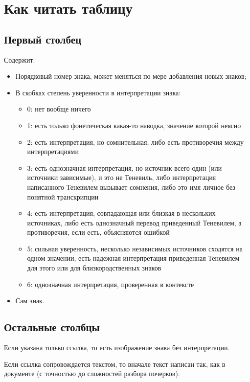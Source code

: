 \documentclass{article}
\begin{document}
\section{Как читать таблицу} 

\subsection{Первый столбец}
Содержит: 

\begin{itemize}
\item Порядковый номер знака, может меняться по мере добавления новых знаков; 
\item В скобках степень уверенности в интерпретации знака:
	\begin{itemize}
		\item 0:	нет вообще ничего
		\item 1: 	есть только фонетическая какая-то наводка, значение которой неясно
		\item 2:	есть интерпретация, но сомнительная, либо есть противоречия между интерпретациями
		\item 3:	есть однозначная интерпретация, но источник всего один (или источники зависимые), и это не Теневиль, либо интерпретация написанного Теневилем вызывает сомнения, либо это имя личное без понятной транскрипции
		\item 4:	есть интерпретация, совпадающая или близкая в нескольких источниках,  либо есть однозначный перевод приведенный Теневилем, а противоречия, если есть, объясняются ошибкой
		\item 5:	сильная уверенность, несколько независимых источников сходятся на одном значении, есть надежная интерпретация приведенная Теневилем для этого или для близкородственных знаков 
		\item 6:	однозначная интерпретация, проверенная в контексте %
	\end{itemize}
\item Сам знак.
\end{itemize}

\subsection{Остальные столбцы}

Если указана только ссылка, то есть изображение знака без интерпретации.

Если ссылка сопровождается текстом, то вначале текст написан так, как в документе (с точностью до сложностей разбора почерков). 
\end{document}
